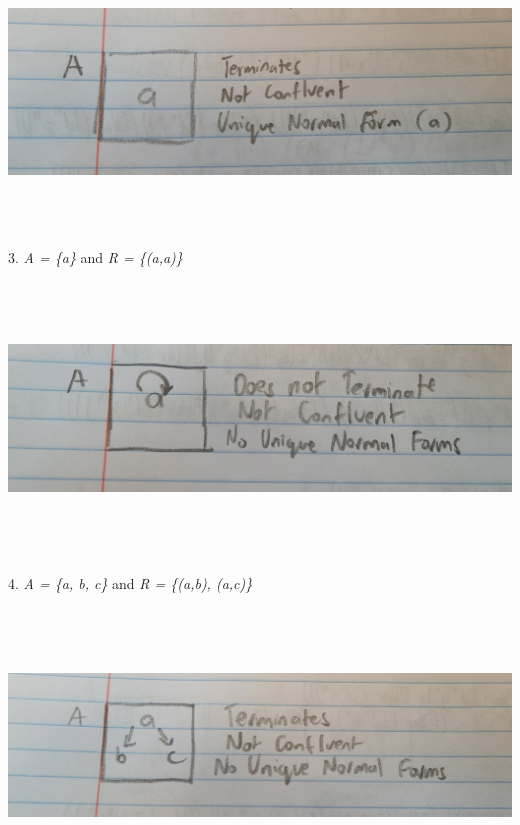 \documentclass{article}
\theoremstyle{theorem}
\theoremstyle{definition}
\theoremstyle{remark}
\begin{document}
\\ \includegraphics[width=15cm, height=8cm]{Report Images/week7_2.jpg}
\\3. \textit{A = \{a\}} and \textit{R = \{(a,a)\}}
\\ \includegraphics[width=15cm, height=8cm]{Report Images/week7_3.jpg}
\\4. \textit{A = \{a, b, c\}} and \textit{R = \{(a,b), (a,c)\}}
\\ \includegraphics[width=15cm, height=8cm]{Report Images/week7_4.jpg}
\end{document}
